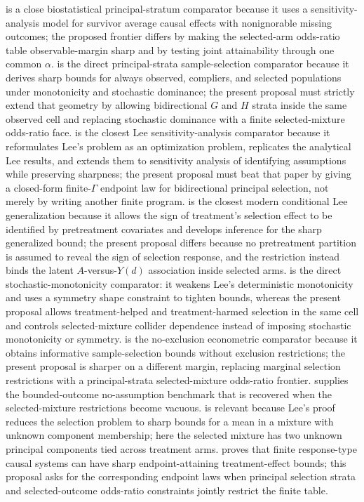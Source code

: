 \documentclass[11pt]{article}
\theoremstyle{definition}
\theoremstyle{plain}
\theoremstyle{remark}
\begin{document}
\citet{EglestonScharfsteinFreemanWest2007} is a close biostatistical principal-stratum comparator because it uses a sensitivity-analysis model for survivor average causal effects with nonignorable missing outcomes; the proposed frontier differs by making the selected-arm odds-ratio table observable-margin sharp and by testing joint attainability through one common \(\alpha\).  \citet{HuberMellace2015SharpSelection} is the direct principal-strata sample-selection comparator because it derives sharp bounds for always observed, compliers, and selected populations under monotonicity and stochastic dominance; the present proposal must strictly extend that geometry by allowing bidirectional \(G\) and \(H\) strata inside the same observed cell and replacing stochastic dominance with a finite selected-mixture odds-ratio face.  \citet{LaffersNedela2017Sensitivity} is the closest Lee sensitivity-analysis comparator because it reformulates Lee's problem as an optimization problem, replicates the analytical Lee results, and extends them to sensitivity analysis of identifying assumptions while preserving sharpness; the present proposal must beat that paper by giving a closed-form finite-\(\Gamma\) endpoint law for bidirectional principal selection, not merely by writing another finite program.  \citet{Semenova2025GeneralizedLee} is the closest modern conditional Lee generalization because it allows the sign of treatment's selection effect to be identified by pretreatment covariates and develops inference for the sharp generalized bound; the present proposal differs because no pretreatment partition is assumed to reveal the sign of selection response, and the restriction instead binds the latent \(A\)-versus-\(Y(d)\) association inside selected arms.  \citet{Okamoto2025RobustifyLee} is the direct stochastic-monotonicity comparator: it weakens Lee's deterministic monotonicity and uses a symmetry shape constraint to tighten bounds, whereas the present proposal allows treatment-helped and treatment-harmed selection in the same cell and controls selected-mixture collider dependence instead of imposing stochastic monotonicity or symmetry.  \citet{HonoreHu2020Selection} is the no-exclusion econometric comparator because it obtains informative sample-selection bounds without exclusion restrictions; the present proposal is sharper on a different margin, replacing marginal selection restrictions with a principal-strata selected-mixture odds-ratio frontier.  \citet{Manski1990NonparametricBounds} supplies the bounded-outcome no-assumption benchmark that is recovered when the selected-mixture restrictions become vacuous.  \citet{HorowitzManski1995Censoring} is relevant because Lee's proof reduces the selection problem to sharp bounds for a mean in a mixture with unknown component membership; here the selected mixture has two unknown principal components tied across treatment arms.  \citet{BalkePearl1997Bounds} proves that finite response-type causal systems can have sharp endpoint-attaining treatment-effect bounds; this proposal asks for the corresponding endpoint laws when principal selection strata and selected-outcome odds-ratio constraints jointly restrict the finite table.
\end{document}
